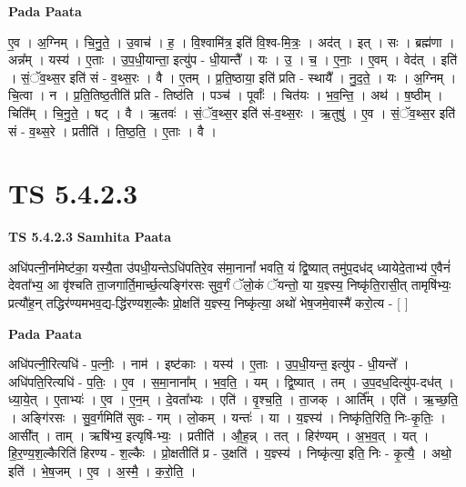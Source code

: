 \documentclass[17pt]{extarticle}
\begin{document}
\textbf{Pada Paata} \newline

ए॒व । अ॒ग्निम् । चि॒नु॒ते॒ । उ॒वाच॑ । ह॒ । वि॒श्वामि॑त्र॒ इति॑ वि॒श्व-मि॒त्रः॒ । अद॑त् । इत् । सः । ब्रह्म॑णा । अन्न᳚म् । यस्य॑ । ए॒ताः । उ॒प॒धी॒यान्ता॒ इत्यु॑प - धी॒यान्तै᳚ । यः । उ॒ । च॒ । ए॒नाः॒ । ए॒वम् । वेद॑त् । इति॑ । सं॒ॅव॒थ्स॒र इति॑ सं - व॒थ्स॒रः । वै । ए॒तम् । प्र॒ति॒ष्ठाया॒ इति॑ प्रति - स्थायै᳚ । नु॒द॒ते॒ । यः । अ॒ग्निम् । चि॒त्वा । न । प्र॒ति॒तिष्ठ॒तीति॑ प्रति - तिष्ठ॑ति । पञ्च॑ । पूर्वाः᳚ । चित॑यः । भ॒व॒न्ति॒ । अथ॑ । ष॒ष्ठीम् । चिति᳚म् । चि॒नु॒ते॒ । षट् । वै । ऋ॒तवः॑ । सं॒ॅव॒थ्स॒र इति॑ सं-व॒थ्स॒रः । ऋ॒तुषु॑ । ए॒व । सं॒ॅव॒थ्स॒र इति॑ सं - व॒थ्स॒रे । प्रतीति॑ । ति॒ष्ठ॒ति॒ । ए॒ताः । वै ।  \newline





\section{ TS 5.4.2.3 }

\textbf{TS 5.4.2.3 } \newline
\textbf{Samhita Paata} \newline

अधि॑पत्नी॒र्नामेष्ट॑का॒ यस्यै॒ता उ॑पधी॒यन्तेऽधि॑पतिरे॒व स॑मा॒नानां᳚ भवति॒ यं द्वि॒ष्यात् तमु॑प॒दध॑द् ध्यायेदे॒ताभ्य॑ ए॒वैनं॑ देवता᳚भ्य॒ आ वृ॑श्चति ता॒जगार्ति॒मार्च्छ॒त्यङ्गि॑रसः सुव॒र्गं ॅलो॒कं ॅयन्तो॒ या य॒ज्ञ्स्य॒ निष्कृ॑ति॒रासी॒त् तामृषि॑भ्यः॒ प्रत्यौ॑ह॒न् तद्धिर॑ण्यमभव॒द्य-द्धि॑रण्यश॒ल्कैः प्रो॒क्षति॑ य॒ज्ञ्स्य॒ निष्कृ॑त्या॒ अथो॑ भेष॒जमे॒वास्मै॑ करो॒त्य - [  ] \newline

\textbf{Pada Paata} \newline

अधि॑पत्नी॒रित्यधि॑ - प॒त्नीः॒ । नाम॑ । इष्ट॑काः । यस्य॑ । ए॒ताः । उ॒प॒धी॒यन्त॒ इत्यु॑प - धी॒यन्ते᳚ । अधि॑पति॒रित्यधि॑ - प॒तिः॒ । ए॒व । स॒मा॒नाना᳚म् । भ॒व॒ति॒ । यम् । द्वि॒ष्यात् । तम् । उ॒प॒दध॒दित्यु॑प-दध॑त् । ध्या॒ये॒त् । ए॒ताभ्यः॑ । ए॒व । ए॒न॒म् । दे॒वता᳚भ्यः । एति॑ । वृ॒श्च॒ति॒ । ता॒जक् । आर्ति᳚म् । एति॑ । ऋ॒च्छ॒ति॒ । अङ्गि॑रसः । सु॒व॒र्गमिति॑ सुवः - गम् । लो॒कम् । यन्तः॑ । या । य॒ज्ञ्स्य॑ । निष्कृ॑ति॒रिति॒ निः-कृ॒तिः॒ । आसी᳚त् । ताम् । ऋषि॑भ्य॒ इत्यृषि॑-भ्यः॒ । प्रतीति॑ । औ॒ह॒न्न् । तत् । हिर॑ण्यम् । अ॒भ॒व॒त् । यत् । हि॒र॒ण्य॒श॒ल्कैरिति॑ हिरण्य - श॒ल्कैः । प्रो॒क्षतीति॑ प्र - उ॒क्षति॑ । य॒ज्ञ्स्य॑ । निष्कृ॑त्या॒ इति॒ निः - कृ॒त्यै॒ । अथो॒ इति॑ । भे॒ष॒जम् । ए॒व । अ॒स्मै॒ । क॒रो॒ति॒ ।  \newline
\end{document}
